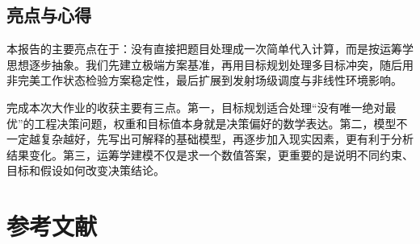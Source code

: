 \documentclass[12pt,a4paper,UTF8]{article}
\begin{document}
\subsection{亮点与心得}

本报告的主要亮点在于：没有直接把题目处理成一次简单代入计算，而是按运筹学思想逐步抽象。我们先建立极端方案基准，再用目标规划处理多目标冲突，随后用非完美工作状态检验方案稳定性，最后扩展到发射场级调度与非线性环境影响。

完成本次大作业的收获主要有三点。第一，目标规划适合处理“没有唯一绝对最优”的工程决策问题，权重和目标值本身就是决策偏好的数学表达。第二，模型不一定越复杂越好，先写出可解释的基础模型，再逐步加入现实因素，更有利于分析结果变化。第三，运筹学建模不仅是求一个数值答案，更重要的是说明不同约束、目标和假设如何改变决策结论。

\clearpage
\section{参考文献}
\label{sec:references}
\end{document}
